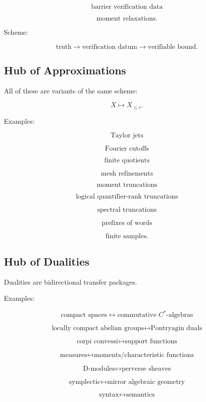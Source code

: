 \documentclass[11pt]{article}
\begin{document}
\[
\text{barrier verification data}
\]

\[
\text{moment relaxations}.
\]

Scheme:

\[
\text{truth}
\to
\text{verification datum}
\to
\text{verifiable bound}.
\]



\subsection{Hub of Approximations}

All of these are variants of the same scheme:

\[
X\mapsto X_{\le r}.
\]

Examples:

\[
\text{Taylor jets}
\]

\[
\text{Fourier cutoffs}
\]

\[
\text{finite quotients}
\]

\[
\text{mesh refinements}
\]

\[
\text{moment truncations}
\]

\[
\text{logical quantifier-rank truncations}
\]

\[
\text{spectral truncations}
\]

\[
\text{prefixes of words}
\]

\[
\text{finite samples}.
\]



\subsection{Hub of Dualities}

Dualities are bidirectional transfer packages.

Examples:

\[
\text{compact spaces}
\leftrightarrow
\text{commutative }C^\ast\text{-algebras}
\]

\[
\text{locally compact abelian groups}
\leftrightarrow
\text{Pontryagin duals}
\]

\[
\text{corpi convessi}
\leftrightarrow
\text{support functions}
\]

\[
\text{measures}
\leftrightarrow
\text{moments/characteristic functions}
\]

\[
\text{D-modules}
\leftrightarrow
\text{perverse sheaves}
\]

\[
\text{symplectic}
\leftrightarrow
\text{mirror algebraic geometry}
\]

\[
\text{syntax}
\leftrightarrow
\text{semantics}
\]
\end{document}
